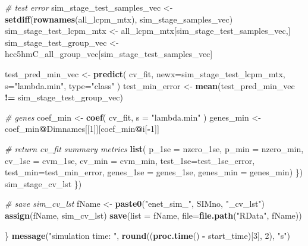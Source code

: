 \documentclass[
]{book}
\newenvironment{Shaded}{\begin{snugshade}}{\end{snugshade}}
\newcommand{\CommentTok}[1]{\textcolor[rgb]{0.56,0.35,0.01}{\textit{#1}}}
\newcommand{\DataTypeTok}[1]{\textcolor[rgb]{0.13,0.29,0.53}{#1}}
\newcommand{\DecValTok}[1]{\textcolor[rgb]{0.00,0.00,0.81}{#1}}
\newcommand{\KeywordTok}[1]{\textcolor[rgb]{0.13,0.29,0.53}{\textbf{#1}}}
\newcommand{\NormalTok}[1]{#1}
\newcommand{\OperatorTok}[1]{\textcolor[rgb]{0.81,0.36,0.00}{\textbf{#1}}}
\newcommand{\StringTok}[1]{\textcolor[rgb]{0.31,0.60,0.02}{#1}}
\begin{document}
\begin{Shaded}
\begin{Highlighting}[]
      \CommentTok{\# test error}
\NormalTok{      sim\_stage\_test\_samples\_vec <{-}}\StringTok{ }\KeywordTok{setdiff}\NormalTok{(}\KeywordTok{rownames}\NormalTok{(all\_lcpm\_mtx), sim\_stage\_samples\_vec)}
\NormalTok{      sim\_stage\_test\_lcpm\_mtx <{-}}\StringTok{ }\NormalTok{all\_lcpm\_mtx[sim\_stage\_test\_samples\_vec,]}
\NormalTok{      sim\_stage\_test\_group\_vec <{-}}\StringTok{ }\NormalTok{hcc5hmC\_all\_group\_vec[sim\_stage\_test\_samples\_vec]}

\NormalTok{      test\_pred\_min\_vec <{-}}\StringTok{ }\KeywordTok{predict}\NormalTok{(}
\NormalTok{       cv\_fit,}
       \DataTypeTok{newx=}\NormalTok{sim\_stage\_test\_lcpm\_mtx,}
       \DataTypeTok{s=}\StringTok{"lambda.min"}\NormalTok{,}
       \DataTypeTok{type=}\StringTok{"class"}
\NormalTok{      )}
\NormalTok{      test\_min\_error <{-}}\StringTok{ }\KeywordTok{mean}\NormalTok{(test\_pred\_min\_vec }\OperatorTok{!=}\StringTok{ }\NormalTok{sim\_stage\_test\_group\_vec)}

      \CommentTok{\# genes}
\NormalTok{      coef\_min <{-}}\StringTok{ }\KeywordTok{coef}\NormalTok{(}
\NormalTok{        cv\_fit,}
        \DataTypeTok{s =} \StringTok{"lambda.min"}
\NormalTok{      )}
\NormalTok{      genes\_min <{-}}\StringTok{ }\NormalTok{coef\_min}\OperatorTok{@}\NormalTok{Dimnames[[}\DecValTok{1}\NormalTok{]][coef\_min}\OperatorTok{@}\NormalTok{i[}\OperatorTok{{-}}\DecValTok{1}\NormalTok{]]}

      \CommentTok{\# return cv\_fit summary metrics}
      \KeywordTok{list}\NormalTok{(}
       \DataTypeTok{p\_1se =}\NormalTok{ nzero\_1se, }
       \DataTypeTok{p\_min =}\NormalTok{ nzero\_min, }
       \DataTypeTok{cv\_1se =}\NormalTok{ cvm\_1se, }
       \DataTypeTok{cv\_min =}\NormalTok{ cvm\_min, }
       \DataTypeTok{test\_1se=}\NormalTok{test\_1se\_error, }
       \DataTypeTok{test\_min=}\NormalTok{test\_min\_error, }
       \DataTypeTok{genes\_1se =}\NormalTok{ genes\_1se,}
       \DataTypeTok{genes\_min =}\NormalTok{ genes\_min)}
\NormalTok{    \})}
\NormalTok{    sim\_stage\_cv\_lst}
\NormalTok{  \})}

  \CommentTok{\# save  sim\_cv\_lst}
\NormalTok{  fName <{-}}\StringTok{ }\KeywordTok{paste0}\NormalTok{(}\StringTok{"enet\_sim\_"}\NormalTok{, SIMno, }\StringTok{"\_cv\_lst"}\NormalTok{)}
  \KeywordTok{assign}\NormalTok{(fName, sim\_cv\_lst)}
  \KeywordTok{save}\NormalTok{(}\DataTypeTok{list =}\NormalTok{ fName, }\DataTypeTok{file=}\KeywordTok{file.path}\NormalTok{(}\StringTok{"RData"}\NormalTok{, fName))}

\NormalTok{\}}
  \KeywordTok{message}\NormalTok{(}\StringTok{"simulation time: "}\NormalTok{, }\KeywordTok{round}\NormalTok{((}\KeywordTok{proc.time}\NormalTok{() }\OperatorTok{{-}}\StringTok{ }\NormalTok{start\_time)[}\DecValTok{3}\NormalTok{], }\DecValTok{2}\NormalTok{), }\StringTok{"s"}\NormalTok{)}
\end{Highlighting}
\end{Shaded}
\end{document}
